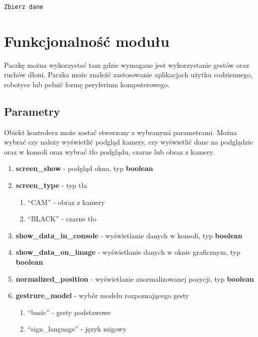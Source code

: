 \begin{lstlisting}[language=python]
    Zbierz dane
\end{lstlisting}

\section{Funkcjonalność modułu}
\quad Paczkę można wykorzystać tam gdzie wymagane jest wykorzystanie gestów oraz ruchów dłoni. Paczka może znaleźć zastosowanie aplikacjach użytku codziennego, robotyce lub pełnić formę peryferium komputerowego.  

\subsection{Parametry}
\quad Obiekt kontrolera może zostać stworzony z wybranymi parametrami. Można wybrać czy należy wyświetlić podgląd kamery, czy wyświetlić dane na podglądzie oraz w konsoli oraz wybrać tło podglądu, czarne lub obraz z kamery. 


\begin{enumerate}
    \item \textbf{screen\_show} - podgląd okna, typ \textbf{boolean}
    \item \textbf{screen\_type} - typ tła
    \begin{enumerate}
        \item \enquote{CAM} - obraz z kamery
        \item \enquote{BLACK} - czarne tło
    \end{enumerate}
    \item \textbf{show\_data\_in\_console} - wyświetlanie danych w konsoli, typ \textbf{boolean}
    \item \textbf{show\_data\_on\_image} - wyświetlanie danych w oknie graficznym, typ \textbf{boolean}
    \item \textbf{normalized\_position} - wyświetlanie znormalizowanej pozycji, typ \textbf{boolean}
    \item \textbf{gestrure\_model} - wybór modelu rozpoznającego gesty
    \begin{enumerate}
        \item \enquote{basic} - gesty podstawowe
        \item \enquote{sign\_language} - język migowy
    \end{enumerate}
\end{enumerate}



